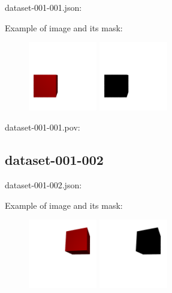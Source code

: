 dataset-001-001.json:
\begin{scriptsize}
\begin{ttfamily}

\end{ttfamily}
\end{scriptsize}

Example of image and its mask:
\begin{center}
\begin{figure}[H]
\centering\includegraphics[width=3cm]{./img-001-001.png}
\centering\includegraphics[width=3cm]{./mask-001-001.png}
\end{figure}
\end{center}

dataset-001-001.pov:
\begin{scriptsize}
\begin{ttfamily}

\end{ttfamily}
\end{scriptsize}

\subsection{dataset-001-002}

dataset-001-002.json:
\begin{scriptsize}
\begin{ttfamily}

\end{ttfamily}
\end{scriptsize}

Example of image and its mask:
\begin{center}
\begin{figure}[H]
\centering\includegraphics[width=3cm]{./img-001-002.png}
\centering\includegraphics[width=3cm]{./mask-001-002.png}
\end{figure}
\end{center}

